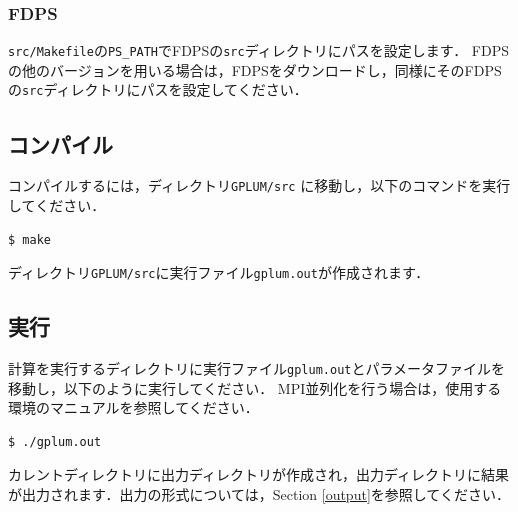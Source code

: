 \documentclass[12pt,a4paper,dvipdfmx]{jsarticle}
\newcommand{\ourcode}{GPLUM\xspace}
\begin{document}
\begin{description}


\end{description}

\subsubsection{FDPS}
\texttt{src/Makefile}の\texttt{PS\_PATH}でFDPSの\texttt{src}ディレクトリにパスを設定します．
FDPSの他のバージョンを用いる場合は，FDPSをダウンロードし，同様にそのFDPSの\texttt{src}ディレクトリにパスを設定してください．


\subsection{コンパイル\label{compile}}

コンパイルするには，ディレクトリ\texttt{\ourcode /src} に移動し，以下のコマンドを実行してください．
\begin{verbatim}
$ make
\end{verbatim}
ディレクトリ\texttt{\ourcode /src}に実行ファイル\texttt{gplum.out}が作成されます．



\subsection{実行}

計算を実行するディレクトリに実行ファイル\texttt{gplum.out}とパラメータファイルを移動し，以下のように実行してください．
MPI並列化を行う場合は，使用する環境のマニュアルを参照してください．
\begin{verbatim}
$ ./gplum.out
\end{verbatim}
カレントディレクトリに出力ディレクトリが作成され，出力ディレクトリに結果が出力されます．出力の形式については，Section \ref{output}を参照してください．
\end{document}
